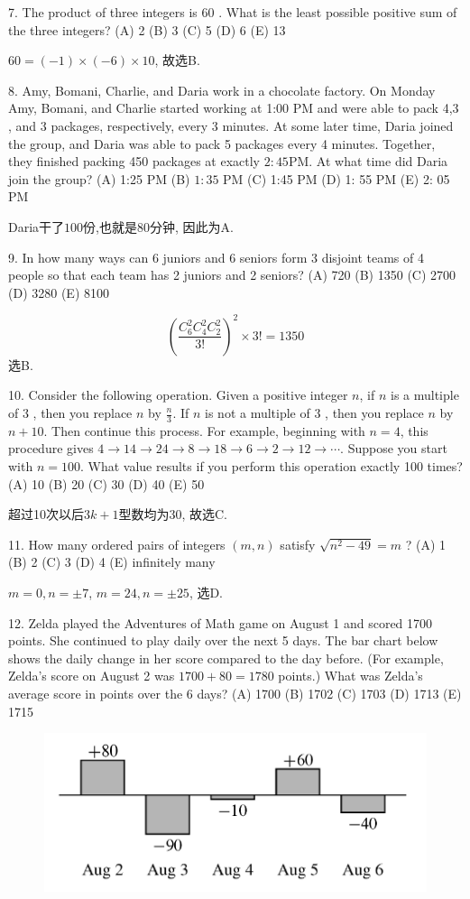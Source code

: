 \documentclass[12pt,a4paper]{article}
\theoremstyle{definition}
\begin{document}
7. The product of three integers is 60 . What is the least possible positive sum of the three integers?
(A) 2 (B) 3
(C) 5
(D) 6
(E) 13

$60=(-1)\times (-6)\times 10$, 故选B.

8. Amy, Bomani, Charlie, and Daria work in a chocolate factory. On Monday Amy, Bomani, and Charlie started working at 1:00 PM and were able to pack 4,3 , and 3 packages, respectively, every 3 minutes. At some later time, Daria joined the group, and Daria was able to pack 5 packages every 4 minutes. Together, they finished packing 450 packages at exactly $2: 45 \mathrm{PM}$. At what time did Daria join the group?
(A) 1:25 PM (B) $1: 35$ PM (C) 1:45 PM (D) 1: 55 PM (E) 2: 05 PM

Daria干了$100$份,也就是$80$分钟, 因此为A. 

9. In how many ways can 6 juniors and 6 seniors form 3 disjoint teams of 4 people so that each team has 2 juniors and 2 seniors?
(A) 720
(B) 1350
(C) 2700
(D) 3280
(E) 8100

\begin{equation*}
    (\frac{C_6^2C_4^2C_2^2}{3!})^2\times 3!=1350
\end{equation*}
选B. 

10. Consider the following operation. Given a positive integer $n$, if $n$ is a multiple of 3 , then you replace $n$ by $\frac{n}{3}$. If $n$ is not a multiple of 3 , then you replace $n$ by $n+10$. Then continue this process. For example, beginning with $n=4$, this procedure gives $4 \rightarrow 14 \rightarrow 24 \rightarrow 8 \rightarrow 18 \rightarrow 6 \rightarrow 2 \rightarrow 12 \rightarrow \cdots$. Suppose you start with $n=100$. What value results if you perform this operation exactly 100 times?
(A) 10
(B) 20
(C) 30
(D) 40
(E) 50

超过10次以后$3k+1$型数均为$30$, 故选C. 

11. How many ordered pairs of integers $(m, n)$ satisfy $\sqrt{n^2-49}=m$ ?
(A) 1
(B) 2
(C) 3
(D) 4
(E) infinitely many

$m=0,n=\pm 7$, $m=24,n=\pm 25$, 选D.

12. Zelda played the Adventures of Math game on August 1 and scored 1700 points. She continued to play daily over the next 5 days. The bar chart below shows the daily change in her score compared to the day before. (For example, Zelda's score on August 2 was $1700+80=1780$ points.) What was Zelda's average score in points over the 6 days?
(A) 1700
(B) 1702
(C) 1703
(D) 1713
(E) 1715
\begin{figure}[H]
    \includegraphics[height=0.2\textheight]{12.png}
\end{figure}
\end{document}
